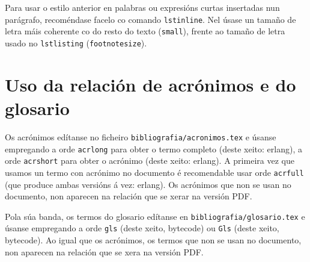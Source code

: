 Para usar o estilo anterior en palabras ou expresións curtas insertadas nun
parágrafo, recoméndase facelo co comando \lstinline{lstinline}.
Nel úsase un tamaño de letra máis coherente co do resto do texto
(\lstinline{small}), frente ao tamaño de letra usado no \lstinline{lstlisting}
({\tt \footnotesize footnotesize}).

\section{Uso da relación de acrónimos e do glosario}

Os acrónimos edítanse no ficheiro \lstinline{bibliografia/acronimos.tex}
e úsanse empregando a orde \lstinline{acrlong} para obter o termo
completo (deste xeito: \acrlong{erlang}), a orde \lstinline{acrshort}
para obter o acrónimo (deste xeito: \acrshort{erlang}). A primeira vez
que usamos un termo con acrónimo no documento é recomendable usar orde
\lstinline{acrfull} (que produce ambas versións á vez:
\acrfull{erlang}). Os acrónimos que non se usan no documento, non
aparecen na relación que se xerar na versión PDF.

Pola súa banda, os termos do glosario edítanse en
\lstinline{bibliografia/glosario.tex} e úsanse empregando a orde
\lstinline{gls} (deste xeito, \gls{bytecode}) ou \lstinline{Gls} (deste
xeito, \Gls{bytecode}). Ao igual que os acrónimos, os termos que non
se usan no documento, non aparecen na relación que se xera na versión
PDF.
